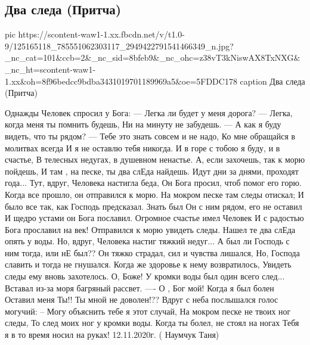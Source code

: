  
 
 

\subsection{Два следа (Притча)}

\ifcmt
pic https://scontent-waw1-1.xx.fbcdn.net/v/t1.0-9/125165118_785551062303117_2949422791541466349_n.jpg?_nc_cat=101&ccb=2&_nc_sid=8bfeb9&_nc_ohc=z38vT3kNiswAX8TxNXG&_nc_ht=scontent-waw1-1.xx&oh=8f96bedcc9bdba3431019701189969a5&oe=5FDDC178
caption Два следа (Притча)
\fi

\begin{multicols}{2}
\obeycr
Однажды Человек спросил у Бога:
--- Легка ли будет у меня дорога?
--- Легка, когда меня ты помнить будешь,
Ни на минуту не забудешь.
--- А как я буду видеть, что ты рядом?
--- Тебе  это знать совсем и не надо,
Ко мне обращайся в молитвах всегда
И я не оставлю тебя никогда.
И в горе с тобою я буду, и в счастье,
В телесных недугах, в душевном ненастье.
А, если захочешь, так к морю пойдешь,
И там , на песке, ты два слЕда найдешь.
Идут дни за днями, проходят года...
Тут, вдруг, Человека настигла беда,
Он Бога просил, чтоб помог его горю.
Когда все прошло, он отправился к морю.
На мокром песке там следы отискал;
И было все так, как Господь предсказал.
Знать был Он с ним рядом, его не оставил
И щедро устами он Бога пославил.
Огромное счастье имел Человек
И с радостью Бога прославил на век!
Отправился к морю увидеть следы.
Нашел те два слЕда опять у воды.
Но, вдруг, Человека настиг тяжкий недуг...
А был ли Господь с ним тогда, или нЕ был??
Он тяжко страдал, сил и чувства лишался,
Но, Господа славить и тогда не гнушался.
Когда же здоровье к нему возвратилось,
Увидеть следы ему вновь захотелось.
О, Боже! У кромки воды был один всего след...
Вставал из-за моря багряный рассвет.
---- О , Бог мой! Когда я был болен
Оставил меня Ты!! Ты мной не доволен!??
Вдруг с неба послышался голос могучий:
-- Могу объяснить тебе я этот случай,
На мокром песке не твоих ног следы,
То след моих ног у кромки воды.
Когда ты болел, не стоял на ногах
Тебя я в то время носил на руках!
12.11.2020г.  ( Наумчук Таня)
\restorecr
\end{multicols}

